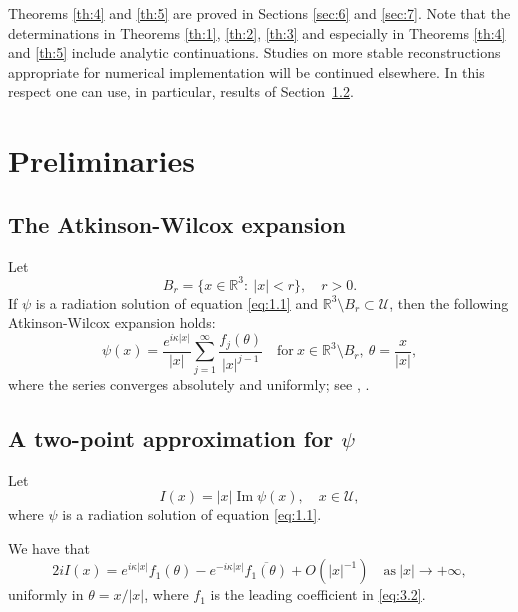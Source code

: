 \documentclass[JEP,XML,SOM,Unicode,NoEqCountersInSection,published]{cedram}
\let\ra\rightarrow
\newcommand{\RR}{\mathbb R}
\renewcommand{\Im}{\mathop{\mathrm{Im}}}
\theoremstyle{definition}
\begin{document}
Theorems \ref{th:4} and \ref{th:5} are proved in Sections \ref{sec:6} and \ref{sec:7}.
Note that the determinations in Theorems \ref{th:1}, \ref{th:2}, \ref{th:3} and especially in Theorems \ref{th:4} and \ref{th:5} include analytic continuations.
Studies on more stable reconstructions appropriate for numerical implementation will be continued elsewhere.
In this respect one can use, in particular, results of Section~\ref{subsec:3.2}.

\section{Preliminaries}\label{sec:3}

\subsection{The Atkinson-Wilcox expansion}

Let
\begin{equation}
\label{eq:3.1}
B_r=\{x\in\RR^3:\ |x|<r\},\quad r>0.
\end{equation}
If $\psi$ is a radiation solution of equation \eqref{eq:1.1} and $\RR^3\setminus B_r \subset \mathcal{U}$, then
the following Atkinson-Wilcox expansion holds:
\begin{equation}
\label{eq:3.2}
\psi(x)=\frac{e^{i\kappa|x|}}{|x|}\sum\limits_{j=1}^{\infty}\frac{f_j(\theta)}{|x|^{j-1}} \quad \text{for}\ x\in \RR^3\setminus B_r,\ \theta=\frac{x}{|x|},
\end{equation}
where the series converges absolutely and uniformly; see \cite{A}, \cite{W}.

\subsection{A two-point approximation for $\psi$}\label{subsec:3.2}

Let
\begin{equation}
\label{eq:3.3}
I(x)=|x|\Im\psi(x),\quad x\in\mathcal{U},
\end{equation}
where $\psi$ is a radiation solution of equation \eqref{eq:1.1}.

We have that
\begin{equation}
\label{eq:3.4}
2iI(x)=e^{i\kappa|x|}f_1(\theta)-e^{-i\kappa|x|} \overline {f_1(\theta)}+O(|x|^{-1})\quad \text{as} \ |x|\ra +\infty,
\end{equation}
uniformly in $\theta=x/|x|$, where $f_1$ is the leading coefficient in \eqref{eq:3.2}.
\end{document}
